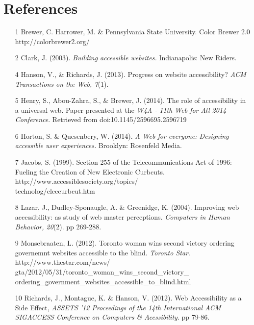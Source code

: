 \documentclass{acm_proc_article-sp}
\begin{document}
\section{References}
\begin{itemize}
\item[1] Brewer, C. Harrower, M. \& Pennsylvania State University. Color Brewer 2.0 http://colorbrewer2.org/
\item[2] Clark, J. (2003). {\it Building accessible websites.} Indianapolis: New Riders.
\item[4] Hanson, V., \& Richards, J. (2013). Progress on website accessibility? {\it ACM Transactions on the Web, 7}(1).
\item[5] Henry, S., Abou-Zahra, S., \& Brewer, J. (2014). The role of accessibility in a universal web. Paper presented at the {\it W4A - 11th Web for All 2014 Conference}. Retrieved from doi:10.1145/2596695.2596719
\item[6] Horton, S. \& Quesenbery, W. (2014). {\it A Web for everyone: Designing accessible user experiences.} Brooklyn: Rosenfeld Media.
\item[7] Jacobs, S. (1999). Section 255 of the Telecommunications Act of 1996: Fueling the Creation of New Electronic Curbcuts. http://www.accessiblesociety.org/topics/\\technolog/eleccurbcut.htm 
\item[8] Lazar, J., Dudley-Sponaugle, A. \& Greenidge, K. (2004). Improving web accessibility: as study of web master perceptions. {\it Computers in Human Behavior, 20}(2). pp 269-288.
\item[9] Monsebraaten, L. (2012). Toronto woman wins second victory ordering governemnt websites accessible to the blind. {\it Toronto Star}. http://www.thestar.com/news/\\gta/2012/05/31/toronto\_woman\_wins\_second\_victory\_\\ordering\_government\_websites\_accessible\_to\_blind.html
\item[10] Richards, J., Montague, K. \& Hanson, V. (2012). Web Accessibility as a Side Effect, {\it ASSETS '12 Proceedings of the 14th International ACM SIGACCESS Conference on Computers \& Acessibility}. pp 79-86.
\end{itemize}
\end{document}
